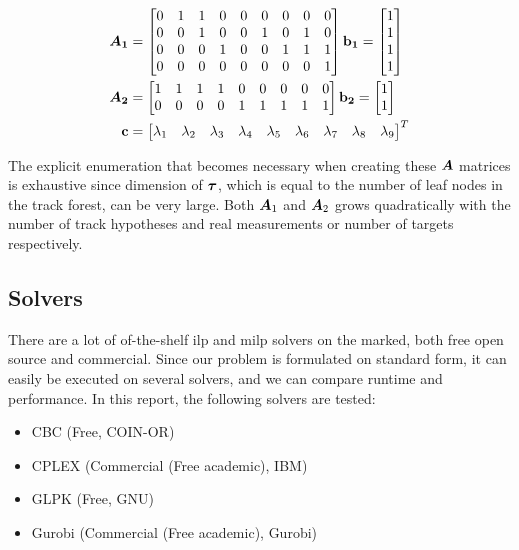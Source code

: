 \begin{equation}
\begin{split}
\bm{A_1} &=\begin{bmatrix}
		0 & 1 & 1 & 0 & 0 & 0 & 0 & 0 & 0 \\
       	0 & 0 & 1 & 0 & 0 & 1 & 0 & 1 & 0 \\
       	0 & 0 & 0 & 1 & 0 & 0 & 1 & 1 & 1 \\
       	0 & 0 & 0 & 0 & 0 & 0 & 0 & 0 & 1 \\
     	\end{bmatrix}
\boldsymbol{\mathbf{b_1}} = 	\begin{bmatrix}
			1 \\ 1  \\ 1 \\ 1
			\end{bmatrix} \\
\bm{A_2} &=\begin{bmatrix}
		1 & 1 & 1 & 1 & 0 & 0 & 0 & 0 & 0 \\
       	0 & 0 & 0 & 0 & 1 & 1 & 1 & 1 & 1 \\
     	\end{bmatrix} 
\boldsymbol{\mathbf{b_2}} = 	\begin{bmatrix}
			1 \\ 1
			\end{bmatrix} \\
\boldsymbol{\mathbf{c}} &=\begin{bmatrix}
		\lambda_1 & \lambda_2 & \lambda_3 & \lambda_4 & \lambda_5 & \lambda_6 & \lambda_7 & \lambda_8 & \lambda_9
		\end{bmatrix}^T \\
\end{split}
\label{eq:example_matrices}
\end{equation}

The explicit enumeration that becomes necessary when creating these $\bm{A}$ matrices is exhaustive since dimension of $\boldsymbol{\mathbf{\tau}}$, which is equal to the number of leaf nodes in the track forest, can be very large. Both $\bm{A}_1$ and $\bm{A}_2$ grows quadratically with the number of track hypotheses and real measurements or number of targets respectively.

\subsection{Solvers}
There are a lot of of-the-shelf \gls{ilp} and \gls{milp} solvers on the marked, both free open source and commercial. Since our problem is formulated on standard form, it can easily be executed on several solvers, and we can compare runtime and performance. In this report, the following solvers are tested:
\begin{itemize}
\item CBC 		(Free, COIN-OR)
\item CPLEX 	(Commercial (Free academic),  IBM)
\item GLPK 		(Free, GNU)
\item Gurobi 	(Commercial (Free academic), Gurobi)
\end{itemize}